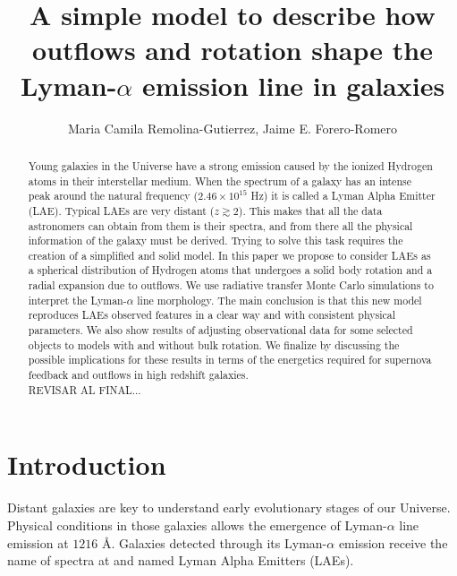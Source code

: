 \documentclass[twocolappendix]{latex/emulateapj}
\begin{document}
\title{A simple model to describe how outflows and rotation shape the Lyman-$\alpha$
  emission line in galaxies}


\author{Maria Camila Remolina-Gutierrez, Jaime E. Forero-Romero} 


\begin{abstract}
\noindent Young galaxies in the Universe have a strong \lya emission
caused by the ionized Hydrogen atoms in their interstellar
medium. When the spectrum of a galaxy has an intense peak around the
\lya natural frequency ($2.46\times 10^{15}$ Hz) it is called a Lyman
Alpha Emitter (LAE). Typical LAEs are very distant ($z \gtrsim
2$). This makes that all the data astronomers can obtain from them is
their spectra, and from there all the physical information of the
galaxy must be derived. Trying to solve this task requires the
creation of a simplified and solid model. In this paper we propose to
consider LAEs as a spherical distribution of Hydrogen atoms that
undergoes a solid body rotation and a radial expansion due to
outflows. We use radiative transfer Monte Carlo simulations to
interpret the Lyman-$\alpha$ line morphology. The main conclusion is
that this new model reproduces LAEs observed features in a clear way
and with consistent physical parameters. We also show results of
adjusting observational data for some selected objects to models with
and without bulk rotation. We finalize by discussing the possible
implications for these results in terms of the energetics required for
supernova feedback and outflows in high redshift galaxies. \\ 

REVISAR AL FINAL...\\
\end{abstract}

\section{Introduction}
\label{sec:intro}

Distant galaxies are key to understand early evolutionary stages of
our Universe.
Physical conditions in those galaxies allows the emergence of
Lyman-$\alpha$ line emission at $1216$ \AA \cite{PartrigePeebles}.
Galaxies detected through its Lyman-$\alpha$ emission receive the name of
spectra at  and named Lyman Alpha Emitters (LAEs).
\end{document}
